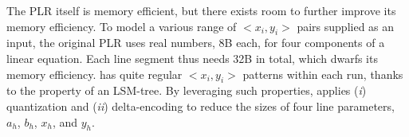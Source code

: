 The PLR itself is memory efficient, but there exists room to further
improve its memory efficiency.  
To model a various range of $<x_i, y_i>$ pairs supplied as an input,
the original PLR uses real numbers, 8B each, for four components of a linear equation. 
Each line segment thus needs 32B in total, which dwarfs its
memory efficiency.  
\ours{} has quite regular $<x_i, y_i>$ patterns within each run,
thanks to the property of an LSM-tree.
By leveraging such properties, \ours{} applies (\textit{i}) quantization and
(\textit{ii}) delta-encoding to reduce the sizes of four line parameters,
$a_h$, $b_h$, $x_h$, and $y_h$.





